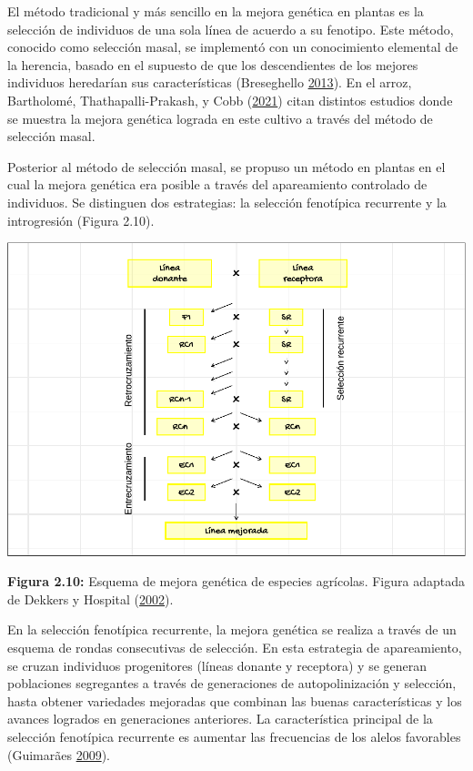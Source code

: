 \documentclass[11pt,spanish,a4paper,oneside,]{book} %
\begin{document}
El método tradicional y más sencillo en la mejora genética en plantas es la selección de individuos de una sola línea de acuerdo a su fenotipo. Este método, conocido como selección masal, se implementó con un conocimiento elemental de la herencia, basado en el supuesto de que los descendientes de los mejores individuos heredarían sus características (Breseghello \protect\hyperlink{ref-cite:57}{2013}). En el arroz, Bartholomé, Thathapalli-Prakash, y Cobb (\protect\hyperlink{ref-cite:58}{2021}) citan distintos estudios donde se muestra la mejora genética lograda en este cultivo a través del método de selección masal.

Posterior al método de selección masal, se propuso un método en plantas en el cual la mejora genética era posible a través del apareamiento controlado de individuos. Se distinguen dos estrategias: la selección fenotípica recurrente y la introgresión (Figura 2.10).

\begin{center}\includegraphics[width=1\linewidth]{figures/Ap_control} \end{center}

\textbf{Figura 2.10:} Esquema de mejora genética de especies agrícolas. Figura adaptada de Dekkers y Hospital (\protect\hyperlink{ref-cite:59}{2002}).

En la selección fenotípica recurrente, la mejora genética se realiza a través de un esquema de rondas consecutivas de selección. En esta estrategia de apareamiento, se cruzan individuos progenitores (líneas donante y receptora) y se generan poblaciones segregantes a través de generaciones de autopolinización y selección, hasta obtener variedades mejoradas que combinan las buenas características y los avances logrados en generaciones anteriores. La característica principal de la selección fenotípica recurrente es aumentar las frecuencias de los alelos favorables (Guimarães \protect\hyperlink{ref-cite:62}{2009}).
\end{document}
